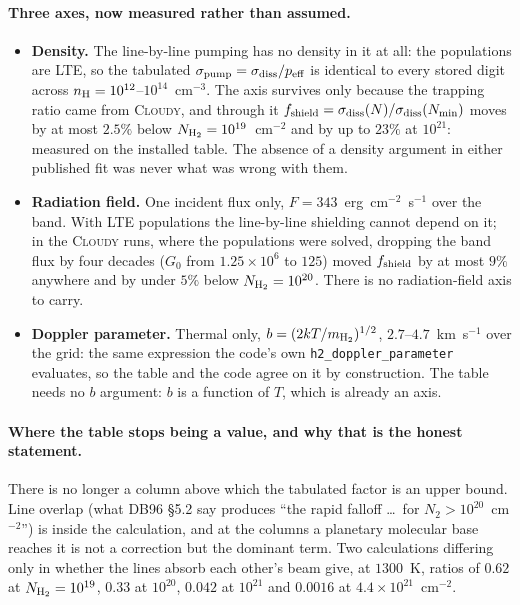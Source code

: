 \documentclass[english,a4paper]{my_memo}
\begin{document}
\paragraph{Three axes, now measured rather than assumed.}

\begin{itemize}
\item \textbf{Density.} The line-by-line pumping has no density in it at all:
  the populations are LTE, so the tabulated $\sigma_{\rm pump} =
  \sigma_{\rm diss}/p_{\rm eff}$ is identical to every stored digit across
  $n_{\rm H} = 10^{12}$--$10^{14}$~cm$^{-3}$. The axis survives only because
  the trapping ratio came from \textsc{Cloudy}, and through it
  $f_{\rm shield} = \sigma_{\rm diss}(N)/\sigma_{\rm diss}(N_{\min})$ moves by
  at most $2.5\%$ below $N_{\rm H_2} = 10^{19}$~cm$^{-2}$ and by up to $23\%$
  at $10^{21}$: measured on the installed table. The absence of a density
  argument in either published fit was never what was wrong with them.
\item \textbf{Radiation field.} One incident flux only,
  $F = 343$~erg~cm$^{-2}$~s$^{-1}$ over the band. With LTE populations the
  line-by-line shielding cannot depend on it; in the \textsc{Cloudy} runs,
  where the populations were solved, dropping the band flux by four decades
  ($G_0$ from $1.25\times10^{6}$ to $125$) moved $f_{\rm shield}$ by at most
  $9\%$ anywhere and by under $5\%$ below $N_{\rm H_2} = 10^{20}$. There is no
  radiation-field axis to carry.
\item \textbf{Doppler parameter.} Thermal only, $b = (2kT/m_{\rm H_2})^{1/2}$,
  $2.7$--$4.7$~km~s$^{-1}$ over the grid: the same expression the code's
  own \texttt{h2\_doppler\_parameter} evaluates, so the table and the code
  agree on it by construction. The table needs no $b$ argument: $b$ is a
  function of $T$, which is already an axis.
\end{itemize}

\paragraph{Where the table stops being a value, and why that is the honest
statement.} There is no longer a column above which the tabulated factor is an
upper bound. Line overlap (what DB96 \S5.2 say produces ``the rapid falloff
\ldots\ for $N_2 > 10^{20}$~cm$^{-2}$'') is inside the calculation, and at
the columns a planetary molecular base reaches it is not a correction but the
dominant term. Two calculations differing only in whether the lines absorb
each other's beam give, at $1300$~K, ratios of $0.62$ at
$N_{\rm H_2} = 10^{19}$, $0.33$ at $10^{20}$, $0.042$ at $10^{21}$ and
$0.0016$ at $4.4\times10^{21}$~cm$^{-2}$.
\end{document}
